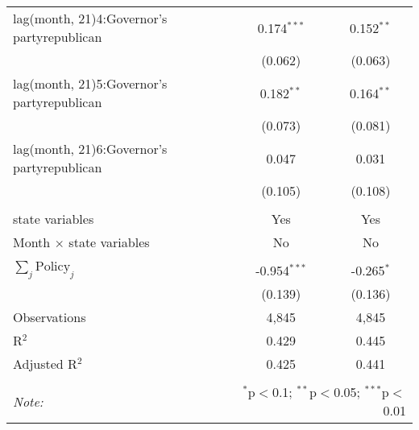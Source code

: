 \begin{tabular}{@{\extracolsep{1pt}}lcc}
  lag(month, 21)4:Governor's partyrepublican & 0.174$^{***}$ & 0.152$^{**}$ \\ 
  & (0.062) & (0.063) \\ 
  lag(month, 21)5:Governor's partyrepublican & 0.182$^{**}$ & 0.164$^{**}$ \\ 
  & (0.073) & (0.081) \\ 
  lag(month, 21)6:Governor's partyrepublican & 0.047 & 0.031 \\ 
  & (0.105) & (0.108) \\ 
 \hline \\[-1.8ex] 
state variables & Yes & Yes \\ 
Month $\times$ state variables & No & No \\ 
\hline \\[-1.8ex] 
$\sum_j \mathrm{Policy}_j$ & -0.954$^{***}$ & -0.265$^{*}$ \\ 
 & (0.139) & (0.136) \\ 
Observations & 4,845 & 4,845 \\ 
R$^{2}$ & 0.429 & 0.445 \\ 
Adjusted R$^{2}$ & 0.425 & 0.441 \\ 
\hline 
\hline \\[-1.8ex] 
\textit{Note:}  & \multicolumn{2}{r}{$^{*}$p$<$0.1; $^{**}$p$<$0.05; $^{***}$p$<$0.01} \\ 
\end{tabular} 
